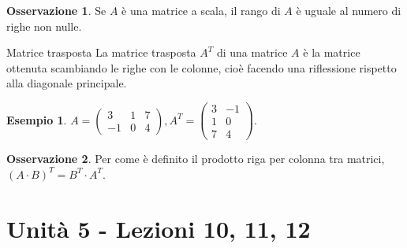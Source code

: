 \documentclass[a4paper]{article}
\theoremstyle{definition}
\newtheorem*{oss}{Osservazione}
\newtheorem*{es}{Esempio}
\begin{document}
\begin{oss}
	Se $A$ è una matrice a scala, il rango di $A$ è uguale al numero di righe non nulle.
\end{oss}

\begin{deff}{Matrice trasposta}{}
	La matrice trasposta $A^T$ di una matrice $A$ è la matrice ottenuta scambiando le righe con le colonne,
	cioè facendo una riflessione rispetto alla diagonale principale.
\end{deff}
\begin{es}
	$A = \begin{pmatrix}
			3  & 1 & 7 \\
			-1 & 0 & 4
		\end{pmatrix}, A^T = \begin{pmatrix}
			3 & -1 \\
			1 & 0  \\
			7 & 4
		\end{pmatrix}$.
\end{es}
\begin{oss}
	Per come è definito il prodotto riga per colonna tra matrici, $(A \cdot B)^T = B^T \cdot A^T$.
\end{oss}

\section{Unità 5 - Lezioni 10, 11, 12}
\end{document}

